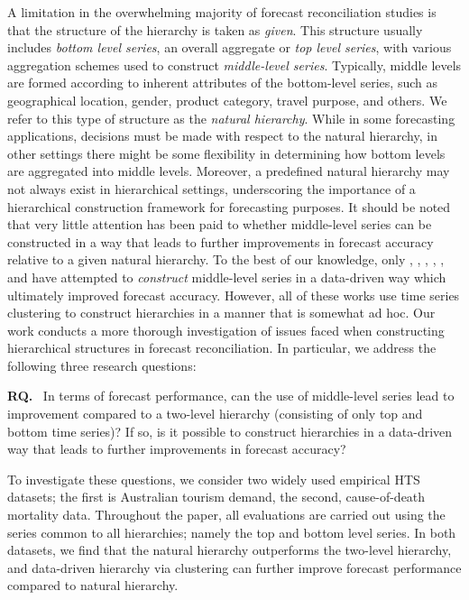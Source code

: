 \documentclass[a4paper,review,12pt,authoryear]{elsarticle}
\newcounter{researchquestion}
\newenvironment{researchquestion}{%
    \refstepcounter{researchquestion}%
    \par\medskip\noindent%
    \textbf{RQ\theresearchquestion.}~%
}{\medskip}
\begin{document}
A limitation in the overwhelming majority of forecast reconciliation studies is that the structure of the hierarchy is taken as \textit{given}. This structure usually includes \textit{bottom level series}, an overall aggregate or \textit{top level series}, with various aggregation schemes used to construct \textit{middle-level series}. Typically, middle levels are formed according to inherent attributes of the bottom-level series, such as geographical location, gender, product category, travel purpose, and others. We refer to this type of structure as the \textit{natural hierarchy}. While in some forecasting applications, decisions must be made with respect to the natural hierarchy, in other settings there might be some flexibility in determining how bottom levels are aggregated into middle levels. Moreover, a predefined natural hierarchy may not always exist in hierarchical settings, underscoring the importance of a hierarchical construction framework for forecasting purposes. It should be noted that very little attention has been paid to whether middle-level series can be constructed in a way that leads to further improvements in forecast accuracy relative to a given natural hierarchy. {To the best of our knowledge, only \cite{yang2017reconciling}, \cite{pangHierarchicalElectricityTime2018}, \cite{liForecastReconciliationApproach2019}, \cite{pangHierarchicalElectricityTime2022}, \cite{cini2023graph}, and \cite{matteraImprovingOutofSampleForecasts2023} have attempted to \textit{construct} middle-level series in a data-driven way which ultimately improved forecast accuracy. } However, all of these works use time series clustering to construct hierarchies in a manner that is somewhat ad hoc. Our work conducts a more thorough investigation of issues faced when  constructing hierarchical structures in forecast reconciliation. In particular, we address the following three research questions:




\begin{researchquestion} In terms of forecast performance, can the use of middle-level series lead to improvement compared to a two-level hierarchy (consisting of only top and bottom time series)? If so, is it possible to construct hierarchies in a data-driven way that leads to further improvements in forecast accuracy?
\end{researchquestion}




To investigate these questions, we consider two widely used empirical HTS datasets; the first is Australian tourism demand, the second, cause-of-death mortality data.  Throughout the paper, all evaluations are carried out using the series common to all hierarchies; namely the top and bottom level series. In both datasets, we find that the natural hierarchy outperforms the two-level hierarchy, and data-driven hierarchy via clustering can further improve forecast performance compared to natural hierarchy.
\end{document}

